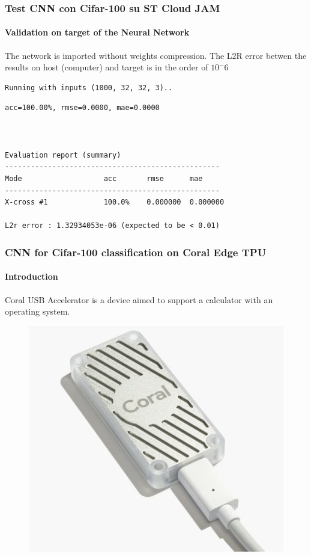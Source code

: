 \documentclass{beamer}
\begin{document}
\begin{frame}[fragile]
\frametitle{Test CNN con Cifar-100 su ST Cloud JAM}
\framesubtitle{Validation on target of the Neural Network}
\small{The network is imported without weights compression. The L2R error betwen the results on host (computer) and target is in the order of \(10^-6\)}
\begin{lstlisting}
Running with inputs (1000, 32, 32, 3)..
\end{lstlisting}

\begin{lstlisting}
acc=100.00%, rmse=0.0000, mae=0.0000



Evaluation report (summary)
--------------------------------------------------
Mode                   acc       rmse      mae      
--------------------------------------------------
X-cross #1             100.0%    0.000000  0.000000 

L2r error : 1.32934053e-06 (expected to be < 0.01)
\end{lstlisting}
\end{frame}

\begin{frame}
\frametitle{CNN for Cifar-100 classification on Coral Edge TPU}
\framesubtitle{Introduction}
Coral USB Accelerator is a device aimed to support a calculator with an operating system.
\begin{figure}
	\centering
	\includegraphics[scale=0.3]{pictures/coral_photo}
\end{figure}
\end{frame}
\end{document}
